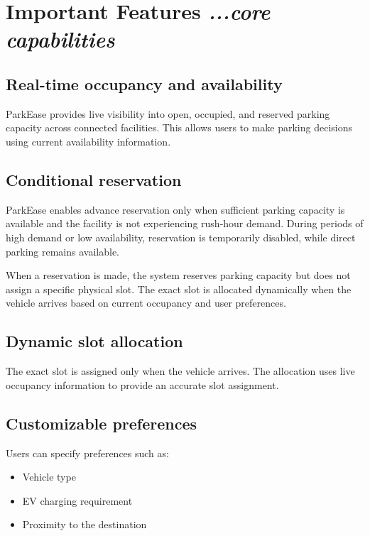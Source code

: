 \documentclass[12pt,a4paper]{article}
\begin{document}
\section{\textbf{Important Features}
\hfill
{\small\mdseries\itshape ...core capabilities}}

\subsection{Real-time occupancy and availability}

ParkEase provides live visibility into open, occupied, and reserved parking capacity across connected facilities. This allows users to make parking decisions using current availability information.

\subsection{Conditional reservation}

ParkEase enables advance reservation only when sufficient parking capacity is available and the facility is not experiencing rush-hour demand. During periods of high demand or low availability, reservation is temporarily disabled, while direct parking remains available.

When a reservation is made, the system reserves parking capacity but does not assign a specific physical slot. The exact slot is allocated dynamically when the vehicle arrives based on current occupancy and user preferences.

\subsection{Dynamic slot allocation}

The exact slot is assigned only when the vehicle arrives. The allocation uses live occupancy information to provide an accurate slot assignment.

\subsection{Customizable preferences}

Users can specify preferences such as:

\begin{itemize}
    \item Vehicle type
    \item EV charging requirement
    \item Proximity to the destination
\end{itemize}
\end{document}
